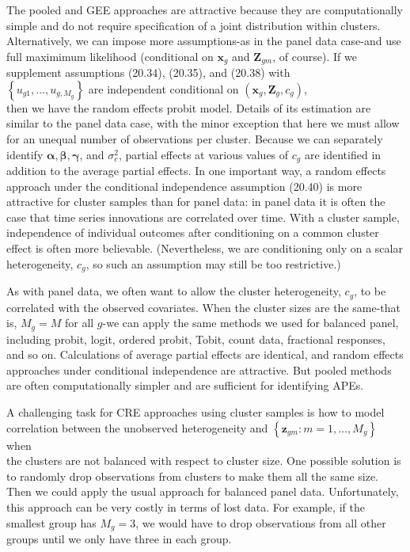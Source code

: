 \documentclass[10pt]{article}
\begin{document}
The pooled and GEE approaches are attractive because they are computationally simple and do not require specification of a joint distribution within clusters. Alternatively, we can impose more assumptions-as in the panel data case-and use full maximimum likelihood (conditional on $\mathbf{x}_{g}$ and $\mathbf{Z}_{g m}$, of course). If we supplement assumptions (20.34), (20.35), and (20.38) with\\
$\left\{u_{g 1}, \ldots, u_{g, M_{g}}\right\}$ are independent conditional on $\left(\mathbf{x}_{g}, \mathbf{Z}_{g}, c_{g}\right)$,\\
then we have the random effects probit model. Details of its estimation are similar to the panel data case, with the minor exception that here we must allow for an unequal number of observations per cluster. Because we can separately identify $\boldsymbol{\alpha} \boldsymbol{,} \boldsymbol{\beta} \boldsymbol{,} \boldsymbol{\gamma}$, and $\sigma_{c}^{2}$, partial effects at various values of $c_{g}$ are identified in addition to the average partial effects. In one important way, a random effects approach under the conditional independence assumption (20.40) is more attractive for cluster samples than for panel data: in panel data it is often the case that time series innovations are correlated over time. With a cluster sample, independence of individual outcomes after conditioning on a common cluster effect is often more believable. (Nevertheless, we are conditioning only on a scalar heterogeneity, $c_{g}$, so such an assumption may still be too restrictive.)

As with panel data, we often want to allow the cluster heterogeneity, $c_{g}$, to be correlated with the observed covariates. When the cluster sizes are the same-that is, $M_{g}=M$ for all $g$-we can apply the same methods we used for balanced panel, including probit, logit, ordered probit, Tobit, count data, fractional responses, and so on. Calculations of average partial effects are identical, and random effects approaches under conditional independence are attractive. But pooled methods are often computationally simpler and are sufficient for identifying APEs.

A challenging task for CRE approaches using cluster samples is how to model correlation between the unobserved heterogeneity and $\left\{\mathbf{z}_{g m}: m=1, \ldots, M_{g}\right\}$ when\\
the clusters are not balanced with respect to cluster size. One possible solution is to randomly drop observations from clusters to make them all the same size. Then we could apply the usual approach for balanced panel data. Unfortunately, this approach can be very costly in terms of lost data. For example, if the smallest group has $M_{g}=3$, we would have to drop observations from all other groups until we only have three in each group.
\end{document}
